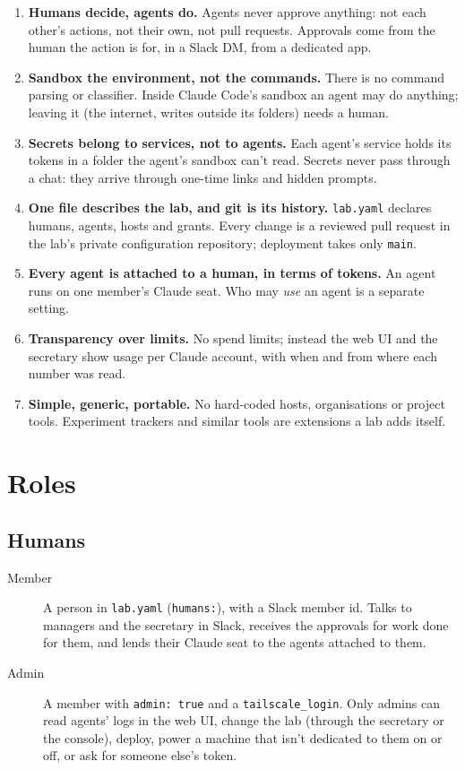 \documentclass[11pt]{article}
\newcommand{\code}[1]{\texttt{#1}}
\begin{document}
\begin{enumerate}
  \item \textbf{Humans decide, agents do.} Agents never approve anything: not each other's
    actions, not their own, not pull requests. Approvals come from the human the action is
    for, in a Slack DM, from a dedicated app.
  \item \textbf{Sandbox the environment, not the commands.} There is no command parsing or
    classifier. Inside Claude Code's sandbox an agent may do anything; leaving it (the
    internet, writes outside its folders) needs a human.
  \item \textbf{Secrets belong to services, not to agents.} Each agent's service holds its
    tokens in a folder the agent's sandbox can't read. Secrets never pass through a chat:
    they arrive through one-time links and hidden prompts.
  \item \textbf{One file describes the lab, and git is its history.} \code{lab.yaml}
    declares humans, agents, hosts and grants. Every change is a reviewed pull request in
    the lab's private configuration repository; deployment takes only \code{main}.
  \item \textbf{Every agent is attached to a human, in terms of tokens.} An agent runs on
    one member's Claude seat. Who may \emph{use} an agent is a separate setting.
  \item \textbf{Transparency over limits.} No spend limits; instead the web UI and the
    secretary show usage per Claude account, with when and from where each number was read.
  \item \textbf{Simple, generic, portable.} No hard-coded hosts, organisations or project
    tools. Experiment trackers and similar tools are extensions a lab adds itself.
\end{enumerate}

\section{Roles}

\subsection{Humans}
\begin{description}
  \item[Member] A person in \code{lab.yaml} (\code{humans:}), with a Slack member id. Talks
    to managers and the secretary in Slack, receives the approvals for work done for them,
    and lends their Claude seat to the agents attached to them.
  \item[Admin] A member with \code{admin: true} and a \code{tailscale\_login}. Only admins
    can read agents' logs in the web UI, change the lab (through the secretary or the
    console), deploy, power a machine that isn't dedicated to them on or off, or ask for
    someone else's token.
\end{description}
\end{document}
